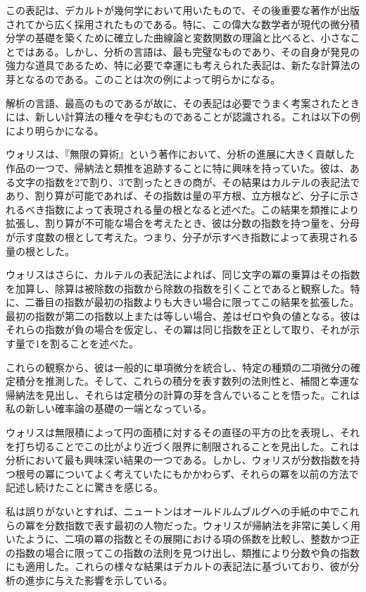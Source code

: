 \documentclass[a4paper,11pt,openany]{ltjsbook}
\begin{document}
この表記は、デカルトが幾何学において用いたもので、その後重要な著作が出版されてから広く採用されたものである。特に、この偉大な数学者が現代の微分積分学の基礎を築くために確立した曲線論と変数関数の理論と比べると、小さなことではある。しかし、分析の言語は、最も完璧なものであり、その自身が発見の強力な道具であるため、特に必要で幸運にも考えられた表記は、新たな計算法の芽となるのである。このことは次の例によって明らかになる。

解析の言語、最高のものであるが故に、その表記は必要でうまく考案されたときには、新しい計算法の種々を孕むものであることが認識される。これは以下の例により明らかになる。

ウォリスは、『無限の算術』という著作において、分析の進展に大きく貢献した作品の一つで、帰納法と類推を追跡することに特に興味を持っていた。彼は、ある文字の指数を2で割り、3で割ったときの商が、その結果はカルテルの表記法であり、割り算が可能であれば、その指数は量の平方根、立方根など、分子に示されるべき指数によって表現される量の根となると述べた。この結果を類推により拡張し、割り算が不可能な場合を考えたとき、彼は分数の指数を持つ量を、分母が示す度数の根として考えた。つまり、分子が示すべき指数によって表現される量の根とした。

ウォリスはさらに、カルテルの表記法によれば、同じ文字の冪の乗算はその指数を加算し、除算は被除数の指数から除数の指数を引くことであると観察した。特に、二番目の指数が最初の指数よりも大きい場合に限ってこの結果を拡張した。最初の指数が第二の指数以上または等しい場合、差はゼロや負の値となる。彼はそれらの指数が負の場合を仮定し、その冪は同じ指数を正として取り、それが示す量で1を割ることを述べた。

これらの観察から、彼は一般的に単項微分を統合し、特定の種類の二項微分の確定積分を推測した。そして、これらの積分を表す数列の法則性と、補間と幸運な帰納法を見出し、それらは定積分の計算の芽を含んでいることを悟った。これは私の新しい確率論の基礎の一端となっている。

ウォリスは無限積によって円の面積に対するその直径の平方の比を表現し、それを打ち切ることでこの比がより近づく限界に制限されることを見出した。これは分析において最も興味深い結果の一つである。しかし、ウォリスが分数指数を持つ根号の冪についてよく考えていたにもかかわらず、それらの冪を以前の方法で記述し続けたことに驚きを感じる。

私は誤りがないとすれば、ニュートンはオールドルムブルグへの手紙の中でこれらの冪を分数指数で表す最初の人物だった。ウォリスが帰納法を非常に美しく用いたように、二項の冪の指数とその展開における項の係数を比較し、整数かつ正の指数の場合に限ってこの指数の法則を見つけ出し、類推により分数や負の指数にも適用した。これらの様々な結果はデカルトの表記法に基づいており、彼が分析の進歩に与えた影響を示している。
\end{document}
